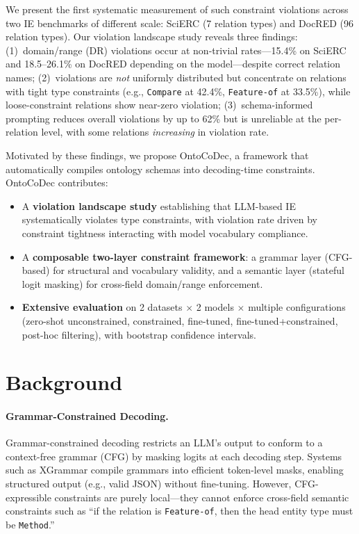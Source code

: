 \documentclass[11pt,a4paper]{article}
\newcommand{\sys}{OntoCoDec}
\begin{document}
We present the first systematic measurement of such constraint violations across two IE benchmarks of different scale: SciERC (7 relation types) and DocRED (96 relation types).
Our violation landscape study reveals three findings:
(1)~domain/range (DR) violations occur at non-trivial rates---15.4\% on SciERC and 18.5--26.1\% on DocRED depending on the model---despite correct relation names;
(2)~violations are \emph{not} uniformly distributed but concentrate on relations with tight type constraints (e.g., \texttt{Compare} at 42.4\%, \texttt{Feature-of} at 33.5\%), while loose-constraint relations show near-zero violation;
(3)~schema-informed prompting reduces overall violations by up to 62\% but is unreliable at the per-relation level, with some relations \emph{increasing} in violation rate.

Motivated by these findings, we propose \sys{}, a framework that automatically compiles ontology schemas into decoding-time constraints.
\sys{} contributes:
\begin{itemize}
  \item A \textbf{violation landscape study} establishing that LLM-based IE systematically violates type constraints, with violation rate driven by constraint tightness interacting with model vocabulary compliance.
  \item A \textbf{composable two-layer constraint framework}: a grammar layer (CFG-based) for structural and vocabulary validity, and a semantic layer (stateful logit masking) for cross-field domain/range enforcement.
  \item \textbf{Extensive evaluation} on 2 datasets $\times$ 2 models $\times$ multiple configurations (zero-shot unconstrained, constrained, fine-tuned, fine-tuned+constrained, post-hoc filtering), with bootstrap confidence intervals.
\end{itemize}

\section{Background}
\label{sec:background}

\paragraph{Grammar-Constrained Decoding.}
Grammar-constrained decoding restricts an LLM's output to conform to a context-free grammar (CFG) by masking logits at each decoding step.
Systems such as XGrammar compile grammars into efficient token-level masks, enabling structured output (e.g., valid JSON) without fine-tuning.
However, CFG-expressible constraints are purely local---they cannot enforce cross-field semantic constraints such as ``if the relation is \texttt{Feature-of}, then the head entity type must be \texttt{Method}.''
\end{document}
